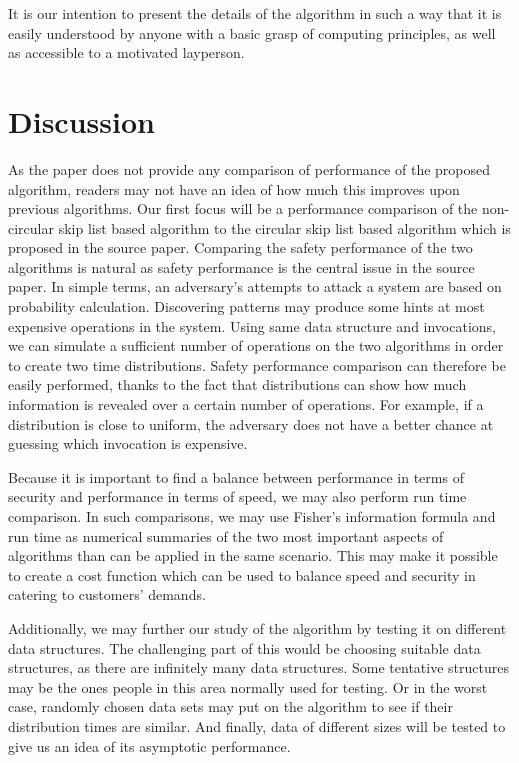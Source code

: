 \documentclass[11pt,twocolumn]{article}
\begin{document}
It is our intention to present the details of the algorithm in such a way that
it is easily understood by anyone with a basic grasp of computing principles,
as well as accessible to a motivated layperson.


\section{Discussion}

As the paper does not provide any comparison of performance of the proposed algorithm, readers may not have an idea of how much this improves upon previous algorithms. Our first focus will be a performance comparison of the non-circular skip list based algorithm to the circular skip list based algorithm which is proposed in the source paper. Comparing the safety performance of the two algorithms is natural as safety performance is the central issue in the source paper. In simple terms, an adversary's attempts to attack a system are based on probability calculation. Discovering patterns may produce some hints at most expensive operations in the system. Using same data structure and invocations, we can simulate a sufficient number of operations on the two algorithms in order to create two time distributions. Safety performance comparison can therefore be easily performed, thanks to the fact that distributions can show how much information is revealed over a certain number of operations. For example, if a distribution is close to uniform, the adversary does not have a better chance at guessing which invocation is expensive. 

Because it is important to find a balance between performance in terms of security and performance in terms of speed, we may also perform run time comparison. In such comparisons, we may use Fisher's information formula and run time as numerical summaries of the two most important aspects of algorithms than can be applied in the same scenario. This may make it possible to create a cost function which can be used to balance speed and security in catering to customers' demands. 

Additionally, we may further our study of the algorithm by testing it on different data structures. The challenging part of this would be choosing suitable data structures, as there are infinitely many data structures. Some tentative structures may be the ones people in this area normally used for testing. Or in the worst case, randomly chosen data sets may put on the algorithm to see if their distribution times are similar. And finally, data of different sizes will be tested to give us an idea of its asymptotic performance. 
\end{document}
